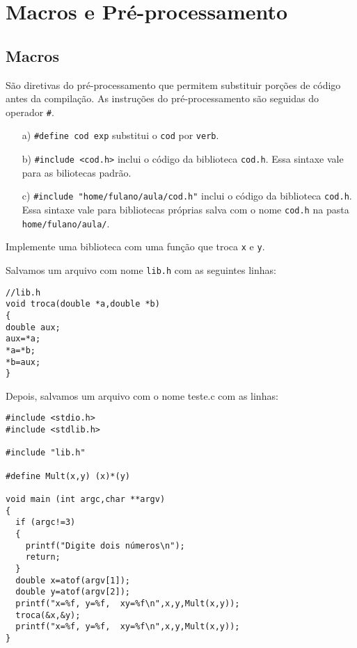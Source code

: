 
\chapter{Macros e Pré-processamento}
\section{Macros}
São diretivas do pré-processamento que permitem substituir porções de código antes da compilação. As instruções do pré-processamento são seguidas do operador \verb|#|. 
\begin{itemize}
 \item[a)] \verb|#define cod exp| substitui o \verb|cod| por \verb|verb|.
 \item[b)] \verb|#include <cod.h>| inclui o código da biblioteca \verb|cod.h|.  Essa sintaxe vale para as biliotecas padrão.
 \item[c)] \verb|#include "home/fulano/aula/cod.h"| inclui o código da biblioteca \verb|cod.h|. Essa sintaxe vale para bibliotecas próprias salva com o nome \verb|cod.h| na pasta \verb|home/fulano/aula/|.
\end{itemize}
\begin{ex}
Implemente uma biblioteca com uma função que troca \verb|x| e \verb|y|. 
\end{ex}
Salvamos um arquivo com nome \verb|lib.h| com as seguintes linhas:
\begin{verbatim}
//lib.h
void troca(double *a,double *b)
{
double aux;
aux=*a;
*a=*b;
*b=aux;
}
\end{verbatim}
Depois, salvamos um arquivo com o nome teste.c com as linhas:
\begin{verbatim}
#include <stdio.h>
#include <stdlib.h>

#include "lib.h"

#define Mult(x,y) (x)*(y)

void main (int argc,char **argv)
{
  if (argc!=3)
  {
    printf("Digite dois números\n");
    return;
  }
  double x=atof(argv[1]);
  double y=atof(argv[2]);
  printf("x=%f, y=%f,  xy=%f\n",x,y,Mult(x,y));
  troca(&x,&y);
  printf("x=%f, y=%f,  xy=%f\n",x,y,Mult(x,y));
}
\end{verbatim}

